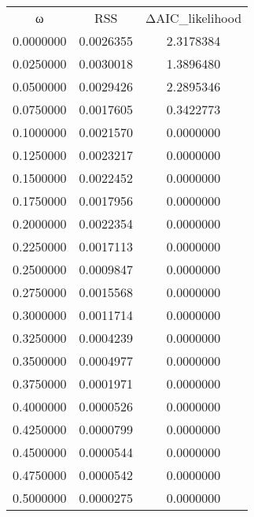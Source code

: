 \begin{tabular}{ccc}
ω & RSS & ΔAIC_likelihood\\
0.0000000 & 0.0026355 & 2.3178384\\
0.0250000 & 0.0030018 & 1.3896480\\
0.0500000 & 0.0029426 & 2.2895346\\
0.0750000 & 0.0017605 & 0.3422773\\
0.1000000 & 0.0021570 & 0.0000000\\
0.1250000 & 0.0023217 & 0.0000000\\
0.1500000 & 0.0022452 & 0.0000000\\
0.1750000 & 0.0017956 & 0.0000000\\
0.2000000 & 0.0022354 & 0.0000000\\
0.2250000 & 0.0017113 & 0.0000000\\
0.2500000 & 0.0009847 & 0.0000000\\
0.2750000 & 0.0015568 & 0.0000000\\
0.3000000 & 0.0011714 & 0.0000000\\
0.3250000 & 0.0004239 & 0.0000000\\
0.3500000 & 0.0004977 & 0.0000000\\
0.3750000 & 0.0001971 & 0.0000000\\
0.4000000 & 0.0000526 & 0.0000000\\
0.4250000 & 0.0000799 & 0.0000000\\
0.4500000 & 0.0000544 & 0.0000000\\
0.4750000 & 0.0000542 & 0.0000000\\
0.5000000 & 0.0000275 & 0.0000000\\
\end{tabular}
